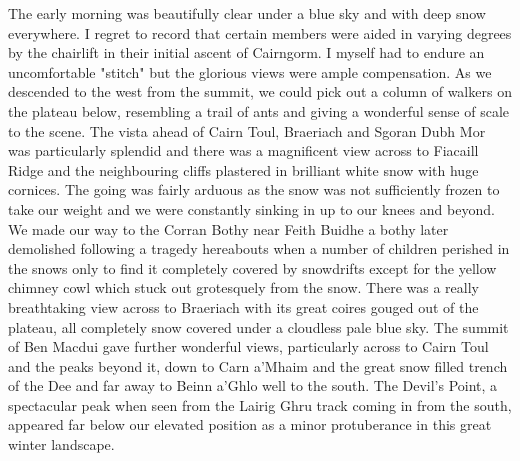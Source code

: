 \documentclass[a5paper,openany,font 10pt]{scrbook}
\begin{document}
The early morning was beautifully clear under a blue sky and
with deep snow everywhere. I regret to record that certain
members were aided in varying degrees by the chairlift in their
initial ascent of Cairngorm. I myself had to endure an
uncomfortable "stitch" but the glorious views were ample
compensation. As we descended to the west from the summit, we
could pick out a column of walkers on the plateau below,
resembling a trail of ants and giving a wonderful sense of scale
to the scene. The vista ahead of Cairn Toul, Braeriach and Sgoran
Dubh Mor was particularly splendid and there was a magnificent
view across to Fiacaill Ridge and the neighbouring cliffs
plastered in brilliant white snow with huge cornices. The going
was fairly arduous as the snow was not sufficiently frozen to
take our weight and we were constantly sinking in up to our knees
and beyond. We made our way to the Corran Bothy near Feith Buidhe
 a bothy later demolished following a tragedy hereabouts when a
number of children perished in the snows  only to find it
completely covered by snowdrifts except for the yellow chimney
cowl which stuck out grotesquely from the snow. There was a
really breathtaking view across to Braeriach with its great
coires gouged out of the plateau, all completely snow covered
under a cloudless pale blue sky. The summit of Ben Macdui gave
further wonderful views, particularly across to Cairn Toul and
the peaks beyond it, down to Carn a'Mhaim and the great snow
filled trench of the Dee and far away to Beinn a'Ghlo well to the
south. The Devil's Point, a spectacular peak when seen from the
Lairig Ghru track coming in from the south, appeared far below
our elevated position as a minor protuberance in this great
winter landscape.
\end{document}

